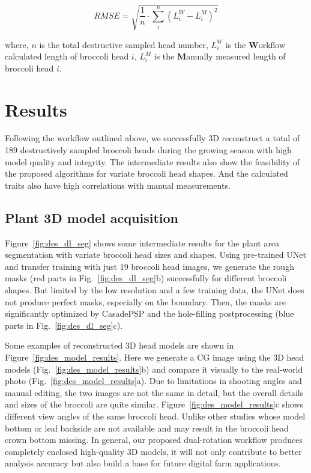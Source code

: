 \begin{equation}
  RMSE = \sqrt{\frac{1}{n} \cdot \sum_{i}^{n} (L_{i}^{W} - L_{i}^{M})^2}
\end{equation}

\noindent
where, $n$ is the total destructive sampled head number, $L_{i}^{W}$ is the  \textbf{W}orkflow calculated length of broccoli head $i$, $L_{i}^{M}$ is the \textbf{M}anually measured length of broccoli head $i$.

\section{Results}

Following the workflow outlined above, we successfully 3D reconstruct a total of 189 destructively sampled broccoli heads during the growing season with high model quality and integrity. The intermediate results also show the feasibility of the proposed algorithms for variate broccoli head shapes. And the calculated traits also have high correlations with manual measurements.

\subsection{Plant 3D model acquisition}

Figure~\ref{fig:des_dl_seg} shows some intermediate results for the plant area segmentation with variate broccoli head sizes and shapes. Using pre-trained UNet and transfer training with just 19 broccoli head images, we generate the rough masks (red parts in Fig.~\ref{fig:des_dl_seg}b) successfully for different broccoli shapes. But limited by the low resolution and a few training data, the UNet does not produce perfect masks, especially on the boundary. Then, the masks are significantly optimized by CasadePSP and the hole-filling postprocessing (blue parts in Fig.~\ref{fig:des_dl_seg}c).



Some examples of reconstructed 3D head models are shown in Figure~\ref{fig:des_model_results}. Here we generate a CG image using the 3D head models (Fig.~\ref{fig:des_model_results}b) and compare it visually to the real-world photo (Fig.~\ref{fig:des_model_results}a). Due to limitations in shooting angles and manual editing, the two images are not the same in detail, but the overall details and sizes of the broccoli are quite similar. Figure~\ref{fig:des_model_results}c shows different view angles of the same broccoli head. Unlike other studies whose model bottom \citep{kochi_3d_2018} or leaf backside \citep{cao_quantifying_2019} are not available and may result in the broccoli head crown bottom missing. In general, our proposed dual-rotation workflow produces completely enclosed high-quality 3D models, it will not only contribute to better analysis accuracy but also build a base for future digital farm applications.

